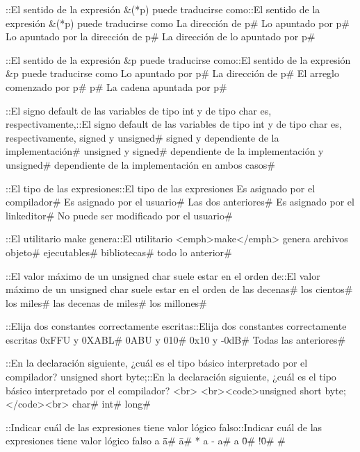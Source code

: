 {{{{{{\question ::El sentido de la expresión &(*p) puede traducirse como::El sentido de la expresión &(*p) puede traducirse como
\choice La dirección de p# 
\choice Lo apuntado por p# 
\choice Lo apuntado por la dirección de p# 
\correctchoice La dirección de lo apuntado por p# 

\question ::El sentido de la expresión &p puede traducirse como::El sentido de la expresión &p puede traducirse como
\choice Lo apuntado por p# 
\correctchoice La dirección de p# 
\choice El arreglo comenzado por p# 
\choice *p# 
\choice La cadena apuntada por p# 

\question ::El signo default de las variables de tipo int y de tipo char es, respectivamente,::El signo default de las variables de tipo int y de tipo char es, respectivamente,
\choice signed y unsigned# 
\correctchoice signed y dependiente de la implementación# 
\choice unsigned y signed# 
\choice dependiente de la implementación y unsigned# 
\choice dependiente de la implementación en ambos casos# 

\question ::El tipo de las expresiones::El tipo de las expresiones
\choice Es asignado por el compilador# 
\choice Es asignado por el usuario# 
\correctchoice Las dos anteriores# 
\choice Es asignado por el linkeditor# 
\choice No puede ser modificado por el usuario# 

\question ::El utilitario make genera::El utilitario <emph>make</emph> genera
\choice archivos objeto# 
\choice ejecutables# 
\choice bibliotecas# 
\correctchoice todo lo anterior# 

\question ::El valor máximo de un unsigned char suele estar en el orden de::El valor máximo de un unsigned char suele estar en el orden de
\choice las decenas# 
\correctchoice los cientos# 
\choice los miles# 
\choice las decenas de miles# 
\choice los millones# 

\question ::Elija dos constantes correctamente escritas\:::Elija dos constantes correctamente escritas\:
\correctchoice 0xFFU y 0XABL# 
\choice 0ABU y 010# 
\choice 0x10 y -0dB# 
\choice Todas las anteriores# 

\question ::En la declaración siguiente, ¿cuál es el tipo básico interpretado por el compilador?  unsigned short byte;::En la declaración siguiente, ¿cuál es el tipo básico interpretado por el compilador? <br> <br><code>unsigned short byte;</code><br>
\choice char# 
\correctchoice int# 
\choice long# 

\question ::Indicar cuál de las expresiones tiene valor lógico falso\:::Indicar cuál de las expresiones tiene valor lógico falso\:
\choice a \=\= a# 
\correctchoice \= a# 
 * a - a# 
\correctchoice a \= 0# 
 !\= 0# 
# 

}}}}}}

